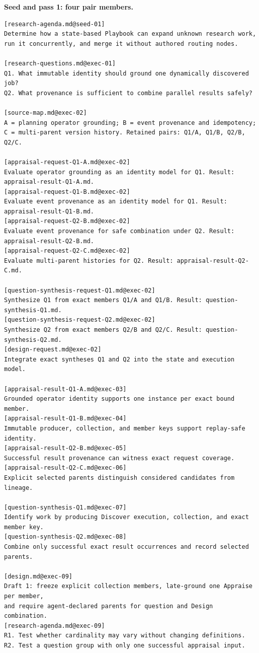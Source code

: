 \documentclass[11pt]{article}
\begin{document}
\medskip
\noindent\textbf{Seed and pass 1: four pair members.}\par\smallskip

\begin{lstlisting}[style=playbook,basicstyle=\ttfamily\scriptsize]
[research-agenda.md@seed-01]
Determine how a state-based Playbook can expand unknown research work,
run it concurrently, and merge it without authored routing nodes.

[research-questions.md@exec-01]
Q1. What immutable identity should ground one dynamically discovered job?
Q2. What provenance is sufficient to combine parallel results safely?

[source-map.md@exec-02]
A = planning operator grounding; B = event provenance and idempotency;
C = multi-parent version history. Retained pairs: Q1/A, Q1/B, Q2/B, Q2/C.

[appraisal-request-Q1-A.md@exec-02]
Evaluate operator grounding as an identity model for Q1. Result: appraisal-result-Q1-A.md.
[appraisal-request-Q1-B.md@exec-02]
Evaluate event provenance as an identity model for Q1. Result: appraisal-result-Q1-B.md.
[appraisal-request-Q2-B.md@exec-02]
Evaluate event provenance for safe combination under Q2. Result: appraisal-result-Q2-B.md.
[appraisal-request-Q2-C.md@exec-02]
Evaluate multi-parent histories for Q2. Result: appraisal-result-Q2-C.md.

[question-synthesis-request-Q1.md@exec-02]
Synthesize Q1 from exact members Q1/A and Q1/B. Result: question-synthesis-Q1.md.
[question-synthesis-request-Q2.md@exec-02]
Synthesize Q2 from exact members Q2/B and Q2/C. Result: question-synthesis-Q2.md.
[design-request.md@exec-02]
Integrate exact syntheses Q1 and Q2 into the state and execution model.

[appraisal-result-Q1-A.md@exec-03]
Grounded operator identity supports one instance per exact bound member.
[appraisal-result-Q1-B.md@exec-04]
Immutable producer, collection, and member keys support replay-safe identity.
[appraisal-result-Q2-B.md@exec-05]
Successful result provenance can witness exact request coverage.
[appraisal-result-Q2-C.md@exec-06]
Explicit selected parents distinguish considered candidates from lineage.

[question-synthesis-Q1.md@exec-07]
Identify work by producing Discover execution, collection, and exact member key.
[question-synthesis-Q2.md@exec-08]
Combine only successful exact result occurrences and record selected parents.

[design.md@exec-09]
Draft 1: freeze explicit collection members, late-ground one Appraise per member,
and require agent-declared parents for question and Design combination.
[research-agenda.md@exec-09]
R1. Test whether cardinality may vary without changing definitions.
R2. Test a question group with only one successful appraisal input.
\end{lstlisting}
\end{document}

